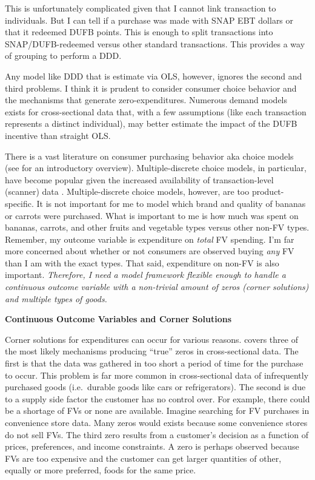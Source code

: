 \documentclass[12pt,letterpaperpaper,]{book}
\begin{document}
This is unfortunately complicated given that I cannot link transaction
to individuals. But I can tell if a purchase was made with SNAP EBT
dollars or that it redeemed DUFB points. This is enough to split
transactions into SNAP/DUFB-redeemed versus other standard transactions.
This provides a way of grouping to perform a DDD.

Any model like DDD that is estimate via OLS, however, ignores the second
and third problems. I think it is prudent to consider consumer choice
behavior and the mechanisms that generate zero-expenditures. Numerous
demand models exists for cross-sectional data that, with a few
assumptions (like each transaction represents a distinct individual),
may better estimate the impact of the DUFB incentive than straight OLS.

There is a vast literature on consumer purchasing behavior aka choice
models (see \citet{train_discrete_2009} for an introductory overview).
Multiple-discrete choice models, in particular, have become popular
given the increased availability of transaction-level (scanner) data
\citep{dube_multiple_2004, hendel_estimating_1999}. Multiple-discrete
choice models, however, are too product-specific. It is not important
for me to model which brand and quality of bananas or carrots were
purchased. What is important to me is how much was spent on bananas,
carrots, and other fruits and vegetable types versus other non-FV types.
Remember, my outcome variable is expenditure on \emph{total} FV
spending. I'm far more concerned about whether or not consumers are
observed buying \emph{any} FV than I am with the exact types. That said,
expenditure on non-FV is also important. \emph{Therefore, I need a model
framework flexible enough to handle a continuous outcome variable with a
non-trivial amount of zeros (corner solutions) and multiple types of
goods.}

\textbf{Continuous Outcome Variables and Corner Solutions}

Corner solutions for expenditures can occur for various reasons.
\citet{pudney_modelling_1989} covers three of the most likely mechanisms
producing ``true'' zeros in cross-sectional data. The first is that the
data was gathered in too short a period of time for the purchase to
occur. This problem is far more common in cross-sectional data of
infrequently purchased goods (i.e.~durable goods like cars or
refrigerators). The second is due to a supply side factor the customer
has no control over. For example, there could be a shortage of FVs or
none are available. Imagine searching for FV purchases in convenience
store data. Many zeros would exists because some convenience stores do
not sell FVs. The third zero results from a customer's decision as a
function of prices, preferences, and income constraints. A zero is
perhaps observed because FVs are too expensive and the customer can get
larger quantities of other, equally or more preferred, foods for the
same price.
\end{document}
